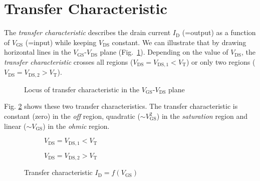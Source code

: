 \documentclass{article}[11pt]
\begin{document}
\section{Transfer Characteristic}

The \textit{transfer characteristic} describes the drain current 
$I_{\mathrm{D}}$ (=output) as a function of $V_{\mathrm{GS}}$ (=input) 
while keeping $V_{\mathrm{DS}}$ constant.
We can illustrate that by drawing horizontal lines in the 
$V_{\mathrm{GS}}$-$V_{\mathrm{DS}}$ plane 
(Fig.~\ref{fig:squarelawregionplottransf}).
Depending on the value of $V_{\mathrm{DS}}$, the 
\textit{transfer characteristic} 
crosses all regions ($V_{\mathrm{DS}}=V_{\mathrm{DS,1}} < V_{\mathrm{T}}$)
or only two regions ($V_{\mathrm{DS}}=V_{\mathrm{DS,2}} > V_{\mathrm{T}}$).

\begin{figure}[H]
  \centering
  \begin{tikzpicture}[scale=1.2]
    
  \end{tikzpicture}
  \caption{Locus of transfer characteristic in the $V_{\mathrm{GS}}$-$V_{\mathrm{DS}}$ plane}
  \label{fig:squarelawregionplottransf}
\end{figure}

Fig. \ref{fig:squarelawtransf} shows these two transfer characteristics.
The transfer characteristic is constant (zero) in the \textit{off} region,
quadratic ($\sim V_{\mathrm{GS}}^2$) in the \textit{saturation} region and 
linear ($\sim V_{\mathrm{GS}}$) in the \textit{ohmic} region.

\begin{figure}[H]
  \centering
  \begin{subfigure}[b]{0.475\textwidth}
      \centering
      \begin{tikzpicture}[scale=1.2]
        
      \end{tikzpicture}
      \caption{$V_{\mathrm{DS}}=V_{\mathrm{DS,1}} < V_{\mathrm{T}}$}
  \end{subfigure}%
  \hfill
  \begin{subfigure}[b]{0.475\textwidth}
      \centering
      \begin{tikzpicture}[scale=1.2]
        
      \end{tikzpicture}
      \caption{$V_{\mathrm{DS}}=V_{\mathrm{DS,2}} > V_{\mathrm{T}}$}
  \end{subfigure}
  \caption{Transfer characteristic $I_{\mathrm{D}} = f(V_{\mathrm{GS}})$}
  \label{fig:squarelawtransf}
\end{figure}
\end{document}
